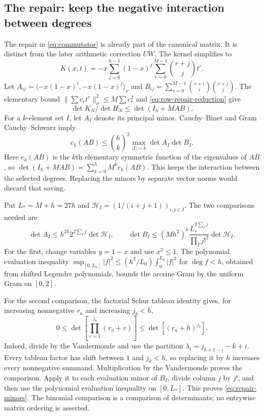 \subsection{The repair: keep the negative interaction between degrees}

The repair in \eqref{eq:commutator} is already part of the canonical
matrix. It is distinct from the later arithmetic correction $UW$.
The kernel simplifies to
\[
 K(x,t)=-x\sum_{j=0}^{h-1}(1-x)^j
                       \sum_{r=0}^{M-1}\binom{r+j}{j}t^r.
\]
Let $A_{ij}=\langle-x(1-x)^i,-x(1-x)^j\rangle_\nu$ and
$B_{ij}=\sum_{r=0}^{M-1}\binom{r+i}i\binom{r+j}j$.
The elementary bound $\|\sum c_rt^r\|_\sigma^2\le M\sum c_r^2$
and \eqref{eq:row-repair-reduction} give
\[
 \det K_N/\det H_N\le\det(I_h+MAB).
\]
For a $k$-element set $I$, let $A_I$ denote its principal minor.
Cauchy--Binet and Gram Cauchy--Schwarz imply
\begin{equation}\label{eq:compound-bound}
 e_k(AB)\le\binom hk^2\max_{|I|=k}\det A_I\det B_I.
\end{equation}
Here $e_k(AB)$ is the $k$th elementary symmetric function of the
eigenvalues of $AB$, so $\det(I_h+MAB)=\sum_{k=0}^h M^k e_k(AB)$.
This keeps the interaction between the selected degrees. Replacing
the minors by separate vector norms would discard that saving.

Put $L_*=M+h=27h$ and $\mathcal H_I=(1/(i+j+1))_{i,j\in I}$.
The two comparisons needed are
\begin{equation}\label{eq:repair-minors}
 \det A_I\le h^{2k}2^{2\sum_I j}\det\mathcal H_I,\qquad
 \det B_I\le(Mh^2)^k
       \frac{L_*^{2\sum_I j}}{\prod_I j!^2}\det\mathcal H_I.
\end{equation}
For the first, change variables $y=1-x$ and use $x^2\le1$.
The polynomial evaluation inequality
$\sup_{[0,L_0]}|f|^2\le(h^2/L_0)\int_0^{L_0}|f|^2$
for $\deg f<h$, obtained from shifted Legendre polynomials, bounds
the arcsine Gram by the uniform Gram on $[0,2]$.

For the second comparison, the factorial Schur tableau identity
\cite[Theorem~2 and (7)--(8), (14)]{BMN} gives, for increasing
nonnegative $r_a$ and increasing $j_b<h$,
\[
 0\le\det\left[\prod_{v=1}^{j_b}(r_a+v)\right]
       \le\det[(r_a+h)^{j_b}].
\]
Indeed, divide by the Vandermonde and use the partition
$\lambda_i=j_{k+1-i}-k+i$. Every tableau factor has shift between
$1$ and $j_k<h$, so replacing it by $h$ increases every nonnegative
summand. Multiplication by the Vandermonde proves the comparison.
Apply it to each evaluation minor of $B_I$, divide column $j$ by
$j!$, and then use the polynomial evaluation inequality on $[0,L_*]$.
This proves \eqref{eq:repair-minors}. The binomial comparison is a
comparison of determinants; no entrywise matrix ordering is asserted.

